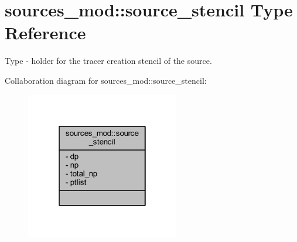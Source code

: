 \hypertarget{structsources__mod_1_1source__stencil}{}\section{sources\+\_\+mod\+:\+:source\+\_\+stencil Type Reference}
\label{structsources__mod_1_1source__stencil}


Type -\/ holder for the tracer creation stencil of the source.  




Collaboration diagram for sources\+\_\+mod\+:\+:source\+\_\+stencil\+:\nopagebreak
\begin{figure}[H]
\begin{center}
\leavevmode
\includegraphics[width=190pt]{structsources__mod_1_1source__stencil__coll__graph}
\end{center}
\end{figure}
